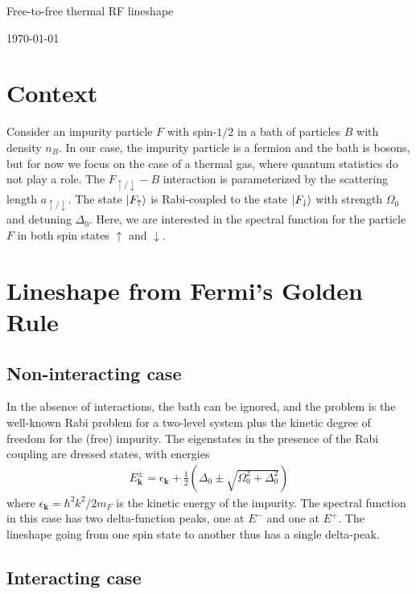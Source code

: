 \documentclass{article}
\theoremstyle{definition}
\newcommand{\f}[2]{\frac{#1}{#2}}
\newcommand{\lp}{\left(}
\newcommand{\rp}{\right)}
\begin{document}
\begin{center}
	\Large{Free-to-free thermal RF lineshape}
\end{center}	

\begin{center}
	\today
\end{center}

\section{Context}

Consider an impurity particle $F$ with spin-$1/2$ in a bath of particles $B$ with density $n_B$. In our case, the impurity particle is a fermion and the bath is bosons, but for now we focus on the case of a thermal gas, where quantum statistics do not play a role. The $F_{\uparrow/\downarrow}-B$ interaction is parameterized by the scattering length $a_{\uparrow/\downarrow}$. The state $\ket{F_\uparrow}$ is Rabi-coupled to the state $\ket{F_\downarrow}$ with strength $\Omega_0$ and detuning $\Delta_0$. Here, we are interested in the spectral function for the particle $F$ in both spin states $\uparrow$ and $\downarrow$. 


\section{Lineshape from Fermi's Golden Rule}

\subsection{Non-interacting case}

In the absence of interactions, the bath can be ignored, and the problem is the well-known Rabi problem for a two-level system plus the kinetic degree of freedom for the (free) impurity. The eigenstates in the presence of the Rabi coupling are dressed states, with energies
\begin{align}
E^{\pm}_\mathbf{k} = \epsilon_\mathbf{k} + \f{1}{2} \lp \Delta_0 \pm \sqrt{\Omega_0^2 + \Delta_0^2} \rp
\end{align}
where $\epsilon_\mathbf{k} = \hbar^2 k^2 / 2m_F$ is the kinetic energy of the impurity. The spectral function in this case has two delta-function peaks, one at $E^-$ and one at $E^+$. The lineshape going from one spin state to another thus has a single delta-peak.

\subsection{Interacting case}
\end{document}
